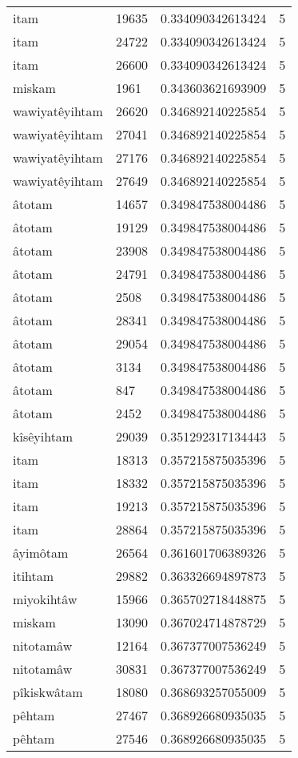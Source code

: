 \begin{longtable}{llll}
itam & 19635 & 0.334090342613424 & 5 \\
itam & 24722 & 0.334090342613424 & 5 \\
itam & 26600 & 0.334090342613424 & 5 \\
miskam & 1961 & 0.343603621693909 & 5 \\
wawiyatêyihtam & 26620 & 0.346892140225854 & 5 \\
wawiyatêyihtam & 27041 & 0.346892140225854 & 5 \\
wawiyatêyihtam & 27176 & 0.346892140225854 & 5 \\
wawiyatêyihtam & 27649 & 0.346892140225854 & 5 \\
âtotam & 14657 & 0.349847538004486 & 5 \\
âtotam & 19129 & 0.349847538004486 & 5 \\
âtotam & 23908 & 0.349847538004486 & 5 \\
âtotam & 24791 & 0.349847538004486 & 5 \\
âtotam & 2508 & 0.349847538004486 & 5 \\
âtotam & 28341 & 0.349847538004486 & 5 \\
âtotam & 29054 & 0.349847538004486 & 5 \\
âtotam & 3134 & 0.349847538004486 & 5 \\
âtotam & 847 & 0.349847538004486 & 5 \\
âtotam & 2452 & 0.349847538004486 & 5 \\
kîsêyihtam & 29039 & 0.351292317134443 & 5 \\
itam & 18313 & 0.357215875035396 & 5 \\
itam & 18332 & 0.357215875035396 & 5 \\
itam & 19213 & 0.357215875035396 & 5 \\
itam & 28864 & 0.357215875035396 & 5 \\
âyimôtam & 26564 & 0.361601706389326 & 5 \\
itihtam & 29882 & 0.363326694897873 & 5 \\
miyokihtâw & 15966 & 0.365702718448875 & 5 \\
miskam & 13090 & 0.367024714878729 & 5 \\
nitotamâw & 12164 & 0.367377007536249 & 5 \\
nitotamâw & 30831 & 0.367377007536249 & 5 \\
pîkiskwâtam & 18080 & 0.368693257055009 & 5 \\
pêhtam & 27467 & 0.368926680935035 & 5 \\
pêhtam & 27546 & 0.368926680935035 & 5 \\

\end{longtable}

